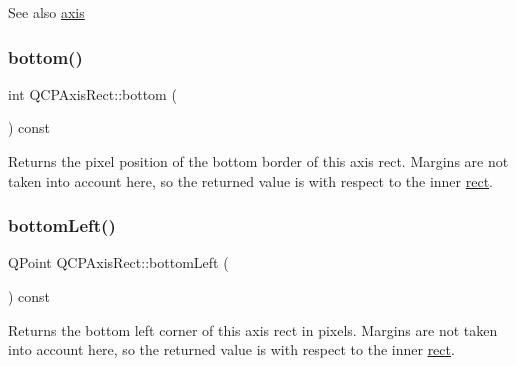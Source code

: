 \begin{DoxySeeAlso}{See also}
\hyperlink{class_q_c_p_axis_rect_a583ae4f6d78b601b732183f6cabecbe1}{axis} 
\end{DoxySeeAlso}
\mbox{\label{class_q_c_p_axis_rect_acefdf1abaa8a8ab681e906cc2be9581e}} 
\subsubsection{\texorpdfstring{bottom()}{bottom()}}
{\footnotesize\ttfamily int Q\+C\+P\+Axis\+Rect\+::bottom (\begin{DoxyParamCaption}{ }\end{DoxyParamCaption}) const\hspace{0.3cm}{\ttfamily [inline]}}

Returns the pixel position of the bottom border of this axis rect. Margins are not taken into account here, so the returned value is with respect to the inner \hyperlink{class_q_c_p_layout_element_a208effccfe2cca4a0eaf9393e60f2dd4}{rect}. \mbox{\label{class_q_c_p_axis_rect_ab15d4311d6535ccd7af504dc0e2b98c6}} 
\subsubsection{\texorpdfstring{bottom\+Left()}{bottomLeft()}}
{\footnotesize\ttfamily Q\+Point Q\+C\+P\+Axis\+Rect\+::bottom\+Left (\begin{DoxyParamCaption}{ }\end{DoxyParamCaption}) const\hspace{0.3cm}{\ttfamily [inline]}}

Returns the bottom left corner of this axis rect in pixels. Margins are not taken into account here, so the returned value is with respect to the inner \hyperlink{class_q_c_p_layout_element_a208effccfe2cca4a0eaf9393e60f2dd4}{rect}. \mbox{\label{class_q_c_p_axis_rect_a36dac884ec8fa3a3a2f3842ca7b7d32d}} 
